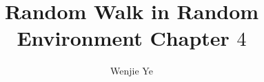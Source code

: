 \documentclass[11pt]{article}
\theoremstyle{definition}
\newenvironment{keywords}{{\bf Key words: }}{}
\begin{document}
\title{ \bf Random Walk in Random Environment Chapter $4$
}
\author{Wenjie Ye}

\maketitle




\end{document}
